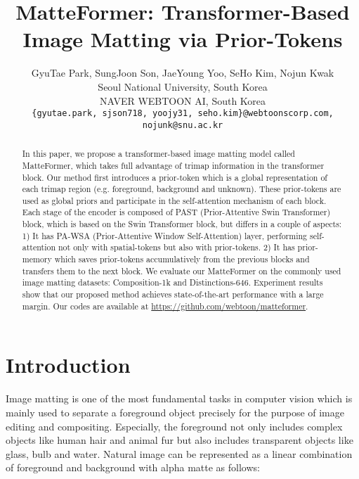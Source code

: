 \documentclass[10pt,twocolumn,letterpaper]{article}
\begin{document}
\title{MatteFormer: Transformer-Based Image Matting via Prior-Tokens}

\author{GyuTae Park, SungJoon Son, JaeYoung Yoo, SeHo Kim, Nojun Kwak\\
 Seoul National University, South Korea \\
 NAVER WEBTOON AI, South Korea\\
{\tt\small \{gyutae.park, sjson718, yoojy31, seho.kim\}@webtoonscorp.com, nojunk@snu.ac.kr}
}

\maketitle


\begin{abstract}
  In this paper, we propose a transformer-based image matting model called MatteFormer, which takes full advantage of trimap information in the transformer block. Our method first introduces a prior-token which is a global representation of each trimap region (e.g. foreground, background and unknown). These prior-tokens are used as global priors and participate in the self-attention mechanism of each block. Each stage of the encoder is composed of PAST (Prior-Attentive Swin Transformer) block, which is based on the Swin Transformer block, but differs in a couple of aspects:
  1) It has PA-WSA (Prior-Attentive Window Self-Attention) layer, performing self-attention not only with spatial-tokens but also with prior-tokens. 2) It has prior-memory which saves prior-tokens accumulatively from the previous blocks and transfers them to the next block.
  We evaluate our MatteFormer on the commonly used image matting datasets: Composition-1k and Distinctions-646. Experiment results show that our proposed method achieves state-of-the-art performance with a large margin. Our codes are available at \url{https://github.com/webtoon/matteformer}.
\end{abstract}

\section{Introduction}
\label{sec:intro}

{\let\thefootnote\relax{}
}

Image matting is one of the most fundamental tasks in computer vision which is mainly used to separate a foreground object precisely for the purpose of image editing and compositing. 
Especially, the foreground not only includes complex objects like human hair and animal fur but also includes transparent objects like glass, bulb and water. Natural image can be represented as a linear combination of foreground  and background  with alpha matte  as follows: 
\end{document}
